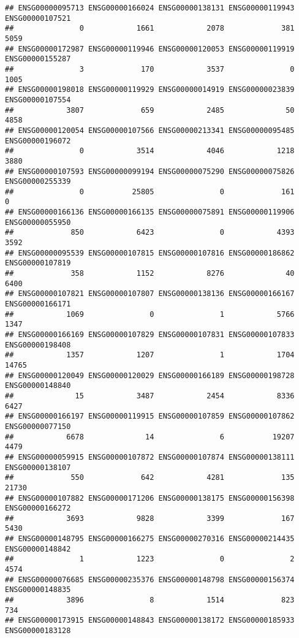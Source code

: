\documentclass[
]{article}
\begin{document}
\begin{verbatim}
## ENSG00000095713 ENSG00000166024 ENSG00000138131 ENSG00000119943 ENSG00000107521 
##               0            1661            2078             381            5059 
## ENSG00000172987 ENSG00000119946 ENSG00000120053 ENSG00000119919 ENSG00000155287 
##               3             170            3537               0            1005 
## ENSG00000198018 ENSG00000119929 ENSG00000014919 ENSG00000023839 ENSG00000107554 
##            3807             659            2485              50            4858 
## ENSG00000120054 ENSG00000107566 ENSG00000213341 ENSG00000095485 ENSG00000196072 
##               0            3514            4046            1218            3880 
## ENSG00000107593 ENSG00000099194 ENSG00000075290 ENSG00000075826 ENSG00000255339 
##               0           25805               0             161               0 
## ENSG00000166136 ENSG00000166135 ENSG00000075891 ENSG00000119906 ENSG00000055950 
##             850            6423               0            4393            3592 
## ENSG00000095539 ENSG00000107815 ENSG00000107816 ENSG00000186862 ENSG00000107819 
##             358            1152            8276              40            6400 
## ENSG00000107821 ENSG00000107807 ENSG00000138136 ENSG00000166167 ENSG00000166171 
##            1069               0               1            5766            1347 
## ENSG00000166169 ENSG00000107829 ENSG00000107831 ENSG00000107833 ENSG00000198408 
##            1357            1207               1            1704           14765 
## ENSG00000120049 ENSG00000120029 ENSG00000166189 ENSG00000198728 ENSG00000148840 
##              15            3487            2454            8336            6427 
## ENSG00000166197 ENSG00000119915 ENSG00000107859 ENSG00000107862 ENSG00000077150 
##            6678              14               6           19207            4479 
## ENSG00000059915 ENSG00000107872 ENSG00000107874 ENSG00000138111 ENSG00000138107 
##             550             642            4281             135           21730 
## ENSG00000107882 ENSG00000171206 ENSG00000138175 ENSG00000156398 ENSG00000166272 
##            3693            9828            3399             167            5430 
## ENSG00000148795 ENSG00000166275 ENSG00000270316 ENSG00000214435 ENSG00000148842 
##               1            1223               0               2            4574 
## ENSG00000076685 ENSG00000235376 ENSG00000148798 ENSG00000156374 ENSG00000148835 
##            3896               8            1514             823             734 
## ENSG00000173915 ENSG00000148843 ENSG00000138172 ENSG00000185933 ENSG00000183128 

\end{verbatim}
\end{document}
